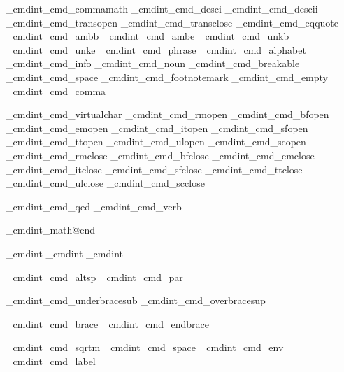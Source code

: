 {\brl@def_cmdint{\brl@text_cmd_commamath}
\brl@def_cmdint{\brl@text_cmd_desci}
\brl@def_cmdint{\brl@text_cmd_descii}
\brl@def_cmdint{\brl@text_cmd_transopen}
\brl@def_cmdint{\brl@text_cmd_transclose}
\brl@def_cmdint{\brl@text_cmd_eqquote}
\brl@def_cmdint{\brl@text_cmd_ambb}
\brl@def_cmdint{\brl@text_cmd_ambe}
\brl@def_cmdint{\brl@text_cmd_unkb}
\brl@def_cmdint{\brl@text_cmd_unke}
\brl@def_cmdint{\brl@text_cmd_phrase}
\brl@def_cmdint{\brl@text_cmd_alphabet}
\brl@def_cmdint{\brl@text_cmd_info}
\brl@def_cmdint{\brl@text_cmd_noun}
\brl@def_cmdint{\brl@text_cmd_breakable}
\brl@def_cmdint{\brl@text_cmd_space}
\brl@def_cmdint{\brl@text_cmd_footnotemark}
\brl@def_cmdint{\brl@text_cmd_empty}%
\brl@def_cmdint{\brl@text_cmd_comma}%

\brl@def_cmdint{\brl@text_cmd_virtualchar}%
\brl@def_cmdint{\brl@text_cmd_rmopen}
\brl@def_cmdint{\brl@text_cmd_bfopen}
\brl@def_cmdint{\brl@text_cmd_emopen}
\brl@def_cmdint{\brl@text_cmd_itopen}
\brl@def_cmdint{\brl@text_cmd_sfopen}
\brl@def_cmdint{\brl@text_cmd_ttopen}
\brl@def_cmdint{\brl@text_cmd_ulopen}
\brl@def_cmdint{\brl@text_cmd_scopen}
\brl@def_cmdint{\brl@text_cmd_rmclose}
\brl@def_cmdint{\brl@text_cmd_bfclose}
\brl@def_cmdint{\brl@text_cmd_emclose}
\brl@def_cmdint{\brl@text_cmd_itclose}
\brl@def_cmdint{\brl@text_cmd_sfclose}
\brl@def_cmdint{\brl@text_cmd_ttclose}
\brl@def_cmdint{\brl@text_cmd_ulclose}
\brl@def_cmdint{\brl@text_cmd_scclose}

\brl@def_cmdint{\brl@text_cmd_qed}%
\brl@def_cmdint{\brl@text_cmd_verb}

\brl@def_cmdint{\brl@document_math@end}

\brl@def_cmdint{\brl@document@end}
\brl@def_cmdint{\brl@document@enddoc}
\brl@def_cmdint{\brl@document@endtext}

\brl@def_cmdint{\brl@info_cmd_altsp}
\brl@def_cmdint{\brl@info_cmd_par}


\brl@def_cmdint{\brl@math_cmd_underbracesub}
\brl@def_cmdint{\brl@math_cmd_overbracesup}

\brl@def_cmdint{\brl@math_cmd_brace}
\brl@def_cmdint{\brl@math_cmd_endbrace}

\brl@def_cmdint{\brl@math_cmd_sqrtm}
\brl@def_cmdint{\brl@math_cmd_space}
\brl@def_cmdint{\brl@math_cmd_env}
\brl@def_cmdint{\brl@math_cmd_label}


}
